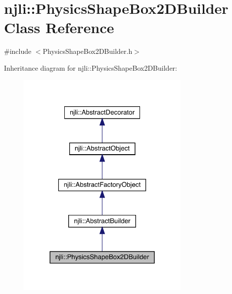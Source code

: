 \hypertarget{classnjli_1_1_physics_shape_box2_d_builder}{}\section{njli\+:\+:Physics\+Shape\+Box2\+D\+Builder Class Reference}
\label{classnjli_1_1_physics_shape_box2_d_builder}


{\ttfamily \#include $<$Physics\+Shape\+Box2\+D\+Builder.\+h$>$}



Inheritance diagram for njli\+:\+:Physics\+Shape\+Box2\+D\+Builder\+:\nopagebreak
\begin{figure}[H]
\begin{center}
\leavevmode
\includegraphics[width=238pt]{classnjli_1_1_physics_shape_box2_d_builder__inherit__graph}
\end{center}
\end{figure}


